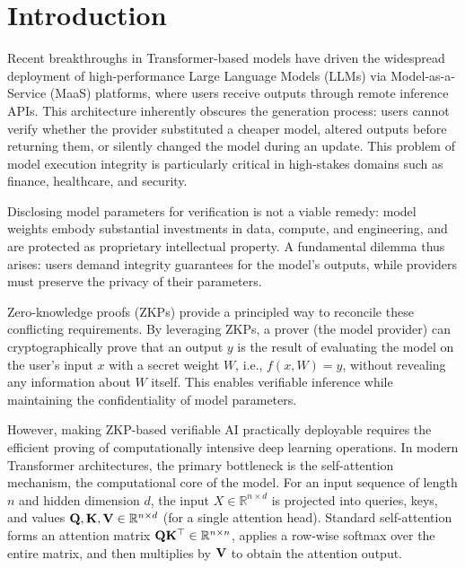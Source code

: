 \documentclass[sigconf,anonymous,review,balance=false]{acmart}
\newcommand{\rev}[1]{{\color{magenta}#1}}
\begin{document}


\maketitle

\section{Introduction}
\rev{Recent breakthroughs in Transformer-based models have driven the widespread deployment of high-performance Large Language Models (LLMs) via Model-as-a-Service (MaaS) platforms, where users receive outputs through remote inference APIs. This architecture inherently obscures the generation process: users cannot verify whether the provider substituted a cheaper model, altered outputs before returning them, or silently changed the model during an update. This problem of model execution integrity is particularly critical in high-stakes domains such as finance, healthcare, and security.}

\rev{Disclosing model parameters for verification is not a viable remedy: model weights embody substantial investments in data, compute, and engineering, and are protected as proprietary intellectual property. A fundamental dilemma thus arises: users demand integrity guarantees for the model’s outputs, while providers must preserve the privacy of their parameters.}

Zero-knowledge proofs (ZKPs) provide a principled way to reconcile these conflicting requirements. By leveraging ZKPs, a prover (the model provider) can cryptographically prove that an output $y$ is the result of evaluating the model on the user’s input $x$ with a secret weight $W$, i.e., $f(x, W) = y$, without revealing any information about $W$ itself. This enables verifiable inference while maintaining the confidentiality of model parameters.

However, making ZKP-based verifiable AI practically deployable requires the efficient proving of computationally intensive deep learning operations. In modern Transformer architectures, the primary bottleneck is the self-attention mechanism, the computational core of the model. For an input sequence of length $n$ and hidden dimension $d$, the input $X \in \mathbb{R}^{n \times d}$ is projected into queries, keys, and values ${\mathbf{Q}}, {\mathbf{K}}, {\mathbf{V}} \in \mathbb{R}^{n \times d}$ (for a single attention head). Standard self-attention forms an attention matrix ${\mathbf{Q}}{\mathbf{K}}^\top \in \mathbb{R}^{n\times n}$, applies a row-wise softmax over the entire matrix, and then multiplies by ${\mathbf{V}}$ to obtain the attention output. 
\end{document}
